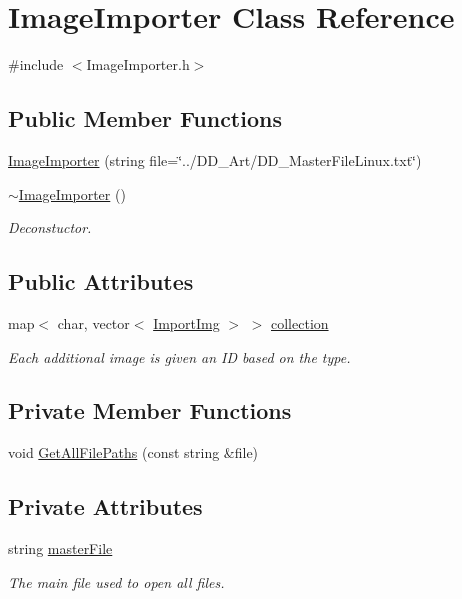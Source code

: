 \hypertarget{classImageImporter}{\section{Image\-Importer Class Reference}
\label{classImageImporter}
}


{\ttfamily \#include $<$Image\-Importer.\-h$>$}

\subsection*{Public Member Functions}
\begin{DoxyCompactItemize}
\item 
\hyperlink{classImageImporter_ad6e4c552d18221322f2d30e9ee2fb695}{Image\-Importer} (string file=\char`\"{}../D\-D\-\_\-\-Art/D\-D\-\_\-\-Master\-File\-Linux.\-txt\char`\"{})
\item 
\hyperlink{classImageImporter_aeb07a2a5d1af993e336ff5bd84217b0c}{$\sim$\-Image\-Importer} ()
\begin{DoxyCompactList}\small\item\em Deconstuctor. \end{DoxyCompactList}\end{DoxyCompactItemize}
\subsection*{Public Attributes}
\begin{DoxyCompactItemize}
\item 
map$<$ char, vector$<$ \hyperlink{classImportImg}{Import\-Img} $>$ $>$ \hyperlink{classImageImporter_a8f0b778e6af2bd36dcda7a35107e4a18}{collection}
\begin{DoxyCompactList}\small\item\em Each additional image is given an I\-D based on the type. \end{DoxyCompactList}\end{DoxyCompactItemize}
\subsection*{Private Member Functions}
\begin{DoxyCompactItemize}
\item 
void \hyperlink{classImageImporter_aed1380088ef265b97ef0aa680ed151f0}{Get\-All\-File\-Paths} (const string \&file)
\end{DoxyCompactItemize}
\subsection*{Private Attributes}
\begin{DoxyCompactItemize}
\item 
string \hyperlink{classImageImporter_ac525acb521f6790cd85877f828fac54c}{master\-File}
\begin{DoxyCompactList}\small\item\em The main file used to open all files. \end{DoxyCompactList}\end{DoxyCompactItemize}


